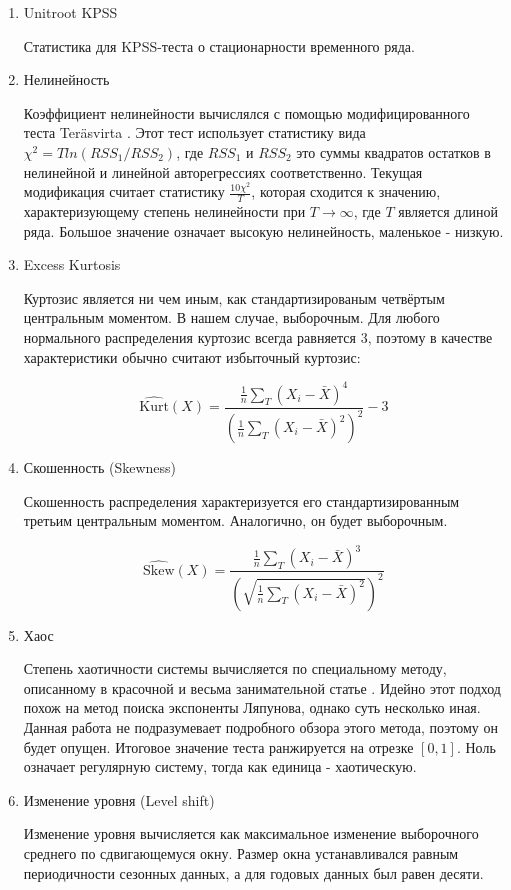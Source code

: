 \documentclass[a4paper,12pt]{article}
\begin{document}
\begin{enumerate}
	\item Unitroot KPSS
	
	Статистика для KPSS-теста о стационарности временного ряда. 
	
	\item Нелинейность 
	
	Коэффициент нелинейности вычислялся с помощью модифицированного теста Teräsvirta \cite{nonlin}. Этот тест использует статистику вида $ \chi^2  = T ln(RSS_1/RSS_2) $, где $ RSS_1 $ и $ RSS_2 $ это суммы квадратов остатков в нелинейной и линейной авторегрессиях соответственно. Текущая модификация считает статистику $ \frac{10 \chi^2}{T} $, которая сходится к значению, характеризующему степень нелинейности при $ T \to \infty $, где $ T $ является длиной ряда. Большое значение означает высокую нелинейность, маленькое - низкую.
	
	\item Excess Kurtosis
	
	Куртозис является ни чем иным, как стандартизированым четвёртым центральным моментом. В нашем случае, выборочным. Для любого нормального распределения куртозис всегда равняется 3, поэтому в качестве характеристики обычно считают избыточный куртозис:
	
	\[ \hat{\text{Kurt}}(X) =\frac{\frac{1}{n} \sum_T (X_i - \bar{X})^4}{(\frac{1}{n} \sum_T (X_i - \bar{X})^2)^2}  - 3 \]
	
	\item Скошенность (Skewness)
	
	Скошенность распределения характеризуется его стандартизированным третьим центральным моментом. Аналогично, он будет выборочным. 
	
	\[ 	\hat{\text{Skew}}(X) =\frac{\frac{1}{n} \sum_T (X_i - \bar{X})^3}{ \left(\sqrt{\frac{1}{n} \sum_T (X_i - \bar{X})^2} \right)^2} \]
	
	\item Хаос
	
	Степень хаотичности системы вычисляется по специальному методу, описанному в красочной и весьма занимательной статье \cite{chaos}.  Идейно этот подход похож на метод поиска экспоненты Ляпунова, однако суть несколько иная. Данная работа не подразумевает подробного обзора этого метода, поэтому он будет опущен. Итоговое значение теста ранжируется на отрезке $ [0, 1] $. Ноль означает регулярную систему, тогда как единица - хаотическую. 
	
	\item Изменение уровня (Level shift)
	
	Изменение уровня вычисляется как максимальное изменение выборочного среднего по сдвигающемуся окну. Размер окна устанавливался равным периодичности сезонных данных, а для годовых данных был равен десяти. 
	

\end{enumerate}
\end{document}

